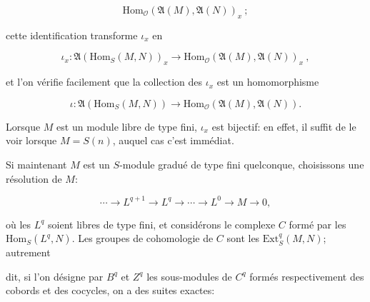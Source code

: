 \begin{equation*}
\mathrm{Hom}_{\mathcal{O}}(\mathfrak{A}(M), \mathfrak{A}(N))_x \ ;
\end{equation*}

cette identification transforme $\iota_x$ en

\begin{equation*}
\iota_x : \mathfrak{A}(\mathrm{Hom}_S(M, N))_x \longrightarrow \mathrm{Hom}_{\mathcal{O}}(\mathfrak{A}(M), \mathfrak{A}(N))_x \ ,
\end{equation*}

et l'on vérifie facilement que la collection des $\iota_x$ est un homomorphisme

\begin{equation*}
\iota : \mathfrak{A}(\mathrm{Hom}_S(M, N)) \longrightarrow \mathrm{Hom}_{\mathcal{O}}(\mathfrak{A}(M), \mathfrak{A}(N)).
\end{equation*}

Lorsque $M$ est un module libre de type fini, $\iota_x$ est bijectif: en effet, il suffit de le voir lorsque $M = S(n)$, auquel cas c'est immédiat.

Si maintenant $M$ est un $S$-module gradué de type fini quelconque, choisissons une résolution de $M$:

\begin{equation*}
\cdots \rightarrow L^{q+1} \rightarrow L^q \rightarrow \cdots \rightarrow L^0 \rightarrow M \rightarrow 0,
\end{equation*}

où les $L^q$ soient libres de type fini, et considérons le complexe $C$ formé par les $\mathrm{Hom}_S(L^q, N)$. Les groupes de cohomologie de $C$ sont les $\mathrm{Ext}_S^q(M, N)$; autrement



%
%
%
dit, si l'on désigne par $B^q$ et $Z^q$ les sous-modules de $C^q$ formés respectivement des cobords et des cocycles, on a des suites exactes:

